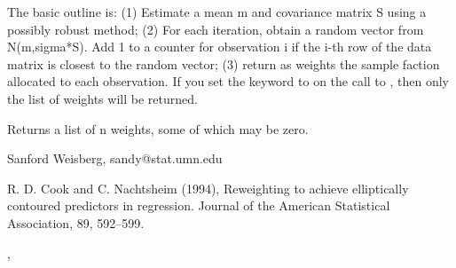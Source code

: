 \begin{Details}\relax
The basic outline is:  (1) Estimate a mean m and covariance matrix S using a
possibly robust method; (2) For each iteration, obtain a random vector
from N(m,sigma*S).  Add 1 to a counter for observation i if the i-th row
of the data matrix is closest to the random vector; (3) return as weights
the sample faction allocated to each observation.  If you set the keyword
 to  on the call to , then only the
list of weights will be returned.
\end{Details}
\begin{Value}
Returns a list of n weights, some of which may be zero.
\end{Value}
\begin{Author}\relax
Sanford Weisberg, sandy@stat.umn.edu
\end{Author}
\begin{References}\relax
R. D. Cook and C. Nachtsheim (1994), Reweighting to achieve
elliptically contoured predictors in regression.  Journal of the American
Statistical Association, 89, 592--599.
\end{References}
\begin{SeeAlso}\relax
{}, 
\end{SeeAlso}

